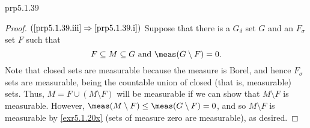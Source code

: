 \begin{prp}{}{prp5.1.39}
\begin{proof}
\blankline
\noindent
$(\cref{prp5.1.39.iii}\Rightarrow \cref{prp5.1.39.i})$ Suppose that there is a $G_{\delta}$ set $G$ and an $F_{\sigma}$ set $F$ such that
\begin{equation}
F\subseteq M\subseteq G\text{ and }\meas (G\setminus F)=0.
\end{equation}
Note that closed sets are measurable because the measure is Borel, and hence $F_{\sigma}$ sets are measurable, being the countable union of closed (that is, measurable) sets.  Thus, $M=F\cup (M\setminus F)$ will be measurable if we can show that $M\setminus F$ is measurable.  However, $\meas (M\setminus F)\leq \meas (G\setminus F)=0$, and so $M\setminus F$ is measurable by \cref{exr5.1.20x} (sets of measure zero are measurable), as desired.
\end{proof}
\end{prp}


